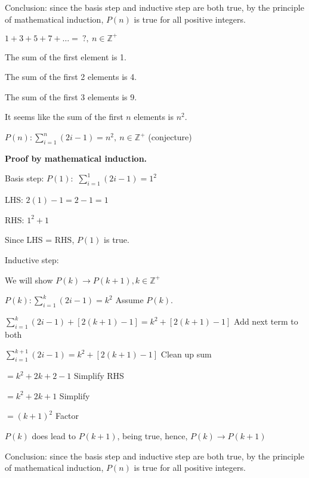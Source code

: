 \documentclass{exam}
\begin{document}
    Conclusion: since the basis step and inductive step are both true, by the principle of mathematical induction, $P(n)$ is true for all positive integers.\\
    
    \newpage
    
    $1+3+5+7+\dots =\ ?,\ n \in \mathbb Z^+$
    
    The sum of the first element is 1.
    
    The sum of the first 2 elements is 4.
    
    The sum of the first 3 elements is 9.
    
    It seems like the sum of the first $n$ elements is $n^2$.
    
    $P(n): \sum_{i=1}^{n} (2i-1) = n^2,\ n \in \mathbb Z^+$ (conjecture)
    
    \textbf{Proof by mathematical induction.}
    
    Basis step: $P(1):$ $\sum_{i=1}^{1} (2i-1) = 1^2$
    
    LHS: $2(1) - 1 = 2-1 = 1$
    
    RHS: $1^2 + 1$
    
    Since LHS = RHS, $P(1)$ is true.
    
    Inductive step:
    
    We will show $P(k) \rightarrow P(k+1), k \in \mathbb Z^+$
    
    $P(k): \sum_{i=1}^{k} (2i-1) = k^2$ Assume $P(k)$.
    
    $\sum_{i=1}^{k} (2i-1) + [2(k+1)-1] = k^2 + [2(k+1)-1]$ Add next term to both
    
    $\sum_{i=1}^{k+1} (2i-1) = k^2 + [2(k+1)-1]$ Clean up sum
    
    \qquad \qquad $= k^2 + 2k + 2 - 1$ Simplify RHS
    
    \qquad \qquad $= k^2 + 2k + 1$ Simplify
    
    \qquad \qquad $= (k+1)^2$ Factor
    
    $P(k)$ does lead to $P(k+1)$, being true, hence, $P(k) \rightarrow P(k+1)$
    
    Conclusion: since the basis step and inductive step are both true, by the principle of mathematical induction, $P(n)$ is true for all positive integers.
    
\end{document}
